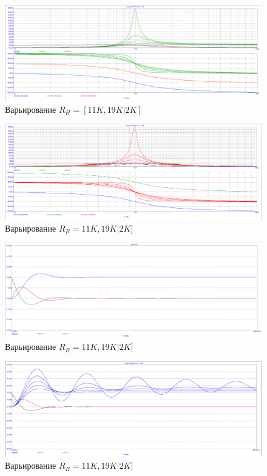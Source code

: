 \documentclass[15pt,a5paper,reqno]{article}
\begin{document}
\begin{figure}[h!]
    \centering
    \includegraphics[width=12cm]{pics/point4_1_var2.png}
    \caption{Варьирование $R_H = [11K, 19K | 2K]$}
    \label{}
\end{figure}




\begin{figure}[h!]
    \centering
    \includegraphics[width=12cm]{pics/point4_1_var3.png}
    \caption{Варьирование $R_B  = 11K, 19K | 2K]$}
    \label{}
\end{figure}




\begin{figure}[h!]
    \centering
    \includegraphics[width=12cm]{pics/point4_2.png}
    \caption{Варьирование $R_B  = 11K, 19K | 2K]$}
    \label{}
\end{figure}


\begin{figure}[h!]
    \centering
    \includegraphics[width=12cm]{pics/point4_2_var1.png}
    \caption{Варьирование $R_B  = 11K, 19K | 2K]$}
    \label{}
\end{figure}
\end{document}
